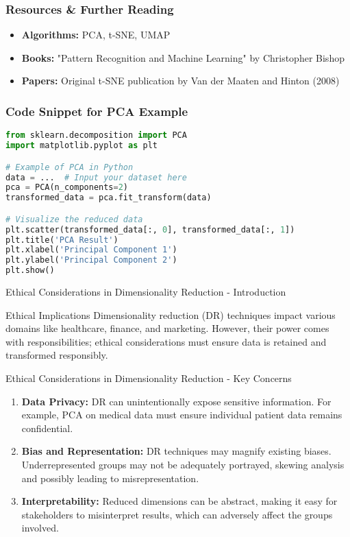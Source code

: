 \documentclass[aspectratio=169]{beamer}
\begin{document}
\begin{frame}[fragile]
    \frametitle{Resources \& Further Reading}
    \begin{itemize}
        \item \textbf{Algorithms:} PCA, t-SNE, UMAP
        \item \textbf{Books:} "Pattern Recognition and Machine Learning" by Christopher Bishop
        \item \textbf{Papers:} Original t-SNE publication by Van der Maaten and Hinton (2008)
    \end{itemize}
\end{frame}

\begin{frame}[fragile]
    \frametitle{Code Snippet for PCA Example}
    \begin{lstlisting}[language=Python]
from sklearn.decomposition import PCA
import matplotlib.pyplot as plt

# Example of PCA in Python
data = ...  # Input your dataset here
pca = PCA(n_components=2)
transformed_data = pca.fit_transform(data)

# Visualize the reduced data
plt.scatter(transformed_data[:, 0], transformed_data[:, 1])
plt.title('PCA Result')
plt.xlabel('Principal Component 1')
plt.ylabel('Principal Component 2')
plt.show()
    \end{lstlisting}
\end{frame}

\begin{frame}[fragile]{Ethical Considerations in Dimensionality Reduction - Introduction}
    \begin{block}{Ethical Implications}
        Dimensionality reduction (DR) techniques impact various domains like healthcare, finance, and marketing. 
        However, their power comes with responsibilities; ethical considerations must ensure data is retained and transformed responsibly.
    \end{block}
\end{frame}

\begin{frame}[fragile]{Ethical Considerations in Dimensionality Reduction - Key Concerns}
    \begin{enumerate}
        \item \textbf{Data Privacy:}  
        DR can unintentionally expose sensitive information. For example, PCA on medical data must ensure individual patient data remains confidential.
        
        \item \textbf{Bias and Representation:}
        DR techniques may magnify existing biases. Underrepresented groups may not be adequately portrayed, skewing analysis and possibly leading to misrepresentation.
        
        \item \textbf{Interpretability:}
        Reduced dimensions can be abstract, making it easy for stakeholders to misinterpret results, which can adversely affect the groups involved.
    \end{enumerate}
\end{frame}
\end{document}
